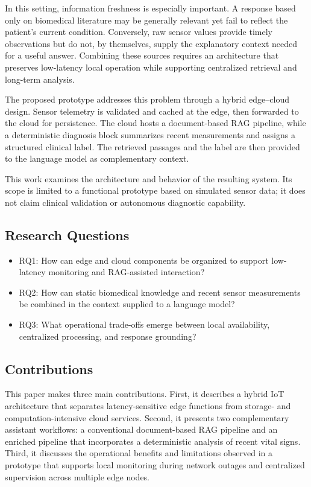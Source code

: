 \documentclass[runningheads]{llncs}
\begin{document}
In this setting, information freshness is especially important. A response based only on biomedical literature may be generally relevant yet fail to reflect the patient's current condition. Conversely, raw sensor values provide timely observations but do not, by themselves, supply the explanatory context needed for a useful answer. Combining these sources requires an architecture that preserves low-latency local operation while supporting centralized retrieval and long-term analysis.

The proposed prototype addresses this problem through a hybrid edge--cloud design. Sensor telemetry is validated and cached at the edge, then forwarded to the cloud for persistence. The cloud hosts a document-based RAG pipeline, while a deterministic diagnosis block summarizes recent measurements and assigns a structured clinical label. The retrieved passages and the label are then provided to the language model as complementary context.

This work examines the architecture and behavior of the resulting system. Its scope is limited to a functional prototype based on simulated sensor data; it does not claim clinical validation or autonomous diagnostic capability.

\subsection{Research Questions}

\begin{itemize}
\item RQ1: How can edge and cloud components be organized to support low-latency monitoring and RAG-assisted interaction?
\item RQ2: How can static biomedical knowledge and recent sensor measurements be combined in the context supplied to a language model?
\item RQ3: What operational trade-offs emerge between local availability, centralized processing, and response grounding?

\end{itemize}
\subsection{Contributions}
This paper makes three main contributions. First, it describes a hybrid IoT architecture that separates latency-sensitive edge functions from storage- and computation-intensive cloud services. Second, it presents two complementary assistant workflows: a conventional document-based RAG pipeline and an enriched pipeline that incorporates a deterministic analysis of recent vital signs. Third, it discusses the operational benefits and limitations observed in a prototype that supports local monitoring during network outages and centralized supervision across multiple edge nodes.
\end{document}
